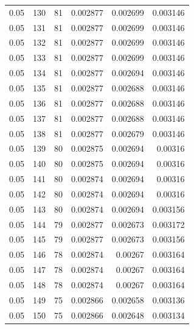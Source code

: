 \begin{tabular}{rrrrrr}
0.05 & 130 & 81 & 0.002877 & 0.002699 & 0.003146 \\
0.05 & 131 & 81 & 0.002877 & 0.002699 & 0.003146 \\
0.05 & 132 & 81 & 0.002877 & 0.002699 & 0.003146 \\
0.05 & 133 & 81 & 0.002877 & 0.002699 & 0.003146 \\
0.05 & 134 & 81 & 0.002877 & 0.002694 & 0.003146 \\
0.05 & 135 & 81 & 0.002877 & 0.002688 & 0.003146 \\
0.05 & 136 & 81 & 0.002877 & 0.002688 & 0.003146 \\
0.05 & 137 & 81 & 0.002877 & 0.002688 & 0.003146 \\
0.05 & 138 & 81 & 0.002877 & 0.002679 & 0.003146 \\
0.05 & 139 & 80 & 0.002875 & 0.002694 & 0.00316 \\
0.05 & 140 & 80 & 0.002875 & 0.002694 & 0.00316 \\
0.05 & 141 & 80 & 0.002874 & 0.002694 & 0.00316 \\
0.05 & 142 & 80 & 0.002874 & 0.002694 & 0.00316 \\
0.05 & 143 & 80 & 0.002874 & 0.002694 & 0.003156 \\
0.05 & 144 & 79 & 0.002877 & 0.002673 & 0.003172 \\
0.05 & 145 & 79 & 0.002877 & 0.002673 & 0.003156 \\
0.05 & 146 & 78 & 0.002874 & 0.00267 & 0.003164 \\
0.05 & 147 & 78 & 0.002874 & 0.00267 & 0.003164 \\
0.05 & 148 & 78 & 0.002874 & 0.00267 & 0.003164 \\
0.05 & 149 & 75 & 0.002866 & 0.002658 & 0.003136 \\
0.05 & 150 & 75 & 0.002866 & 0.002648 & 0.003134 \\
\bottomrule
\end{tabular}
